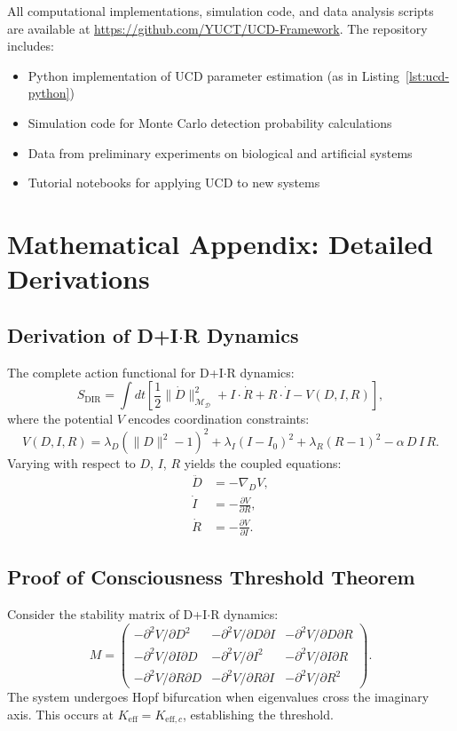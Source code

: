 \documentclass[12pt,a4paper]{article}
\newcommand{\Dict}{\mathcal{D}}
\newcommand{\Mdict}{\mathcal{M}_{\Dict}}
\newcommand{\Ke}{K_{\mathrm{eff}}}
\newcommand{\Kec}{K_{\mathrm{eff},c}}
\begin{document}
	All computational implementations, simulation code, and data analysis scripts are available at \url{https://github.com/YUCT/UCD-Framework}. The repository includes:
	\begin{itemize}
		\item Python implementation of UCD parameter estimation (as in Listing~\ref{lst:ucd-python})
		\item Simulation code for Monte Carlo detection probability calculations
		\item Data from preliminary experiments on biological and artificial systems
		\item Tutorial notebooks for applying UCD to new systems
	\end{itemize}
	
	\appendix
	
	\section{Mathematical Appendix: Detailed Derivations}
	
	\subsection{Derivation of D+I\(\cdot\)R Dynamics}
	
	The complete action functional for D+I\(\cdot\)R dynamics:
	\[
	S_{\mathrm{DIR}} = \int dt \left[ \frac{1}{2}\|\dot{D}\|^2_{\Mdict} + I \cdot \dot{R} + R \cdot \dot{I} - V(D,I,R) \right],
	\]
	where the potential \(V\) encodes coordination constraints:
	\[
	V(D,I,R) = \lambda_D (\|D\|^2 - 1)^2 + \lambda_I (I - I_0)^2 + \lambda_R (R - 1)^2 - \alpha\, D\,I\,R.
	\]
	Varying with respect to \(D\), \(I\), \(R\) yields the coupled equations:
	\begin{align*}
		\ddot{D} &= -\nabla_D V, \\
		\dot{I}  &= -\frac{\partial V}{\partial R}, \\
		\dot{R}  &= -\frac{\partial V}{\partial I}.
	\end{align*}
	
	\subsection{Proof of Consciousness Threshold Theorem}
	
	Consider the stability matrix of D+I\(\cdot\)R dynamics:
	\[
	M = \begin{pmatrix}
		-\partial^2 V/\partial D^2 & -\partial^2 V/\partial D\partial I & -\partial^2 V/\partial D\partial R \\
		-\partial^2 V/\partial I\partial D & -\partial^2 V/\partial I^2 & -\partial^2 V/\partial I\partial R \\
		-\partial^2 V/\partial R\partial D & -\partial^2 V/\partial R\partial I & -\partial^2 V/\partial R^2
	\end{pmatrix}.
	\]
	The system undergoes Hopf bifurcation when eigenvalues cross the imaginary axis. This occurs at \(\Ke = \Kec\), establishing the threshold.
	
\end{document}
